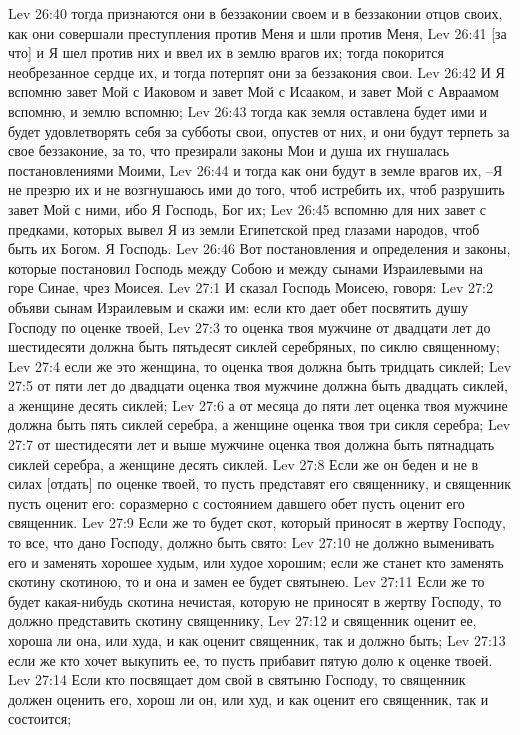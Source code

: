 Lev 26:40  тогда признаются они в беззаконии своем и в беззаконии отцов своих, как они совершали преступления против Меня и шли против Меня,
Lev 26:41  [за что] и Я шел против них и ввел их в землю врагов их; тогда покорится необрезанное сердце их, и тогда потерпят они за беззакония свои.
Lev 26:42  И Я вспомню завет Мой с Иаковом и завет Мой с Исааком, и завет Мой с Авраамом вспомню, и землю вспомню;
Lev 26:43  тогда как земля оставлена будет ими и будет удовлетворять себя за субботы свои, опустев от них, и они будут терпеть за свое беззаконие, за то, что презирали законы Мои и душа их гнушалась постановлениями Моими,
Lev 26:44  и тогда как они будут в земле врагов их, --Я не презрю их и не возгнушаюсь ими до того, чтоб истребить их, чтоб разрушить завет Мой с ними, ибо Я Господь, Бог их;
Lev 26:45  вспомню для них завет с предками, которых вывел Я из земли Египетской пред глазами народов, чтоб быть их Богом. Я Господь.
Lev 26:46  Вот постановления и определения и законы, которые постановил Господь между Собою и между сынами Израилевыми на горе Синае, чрез Моисея.
Lev 27:1  И сказал Господь Моисею, говоря:
Lev 27:2  объяви сынам Израилевым и скажи им: если кто дает обет посвятить душу Господу по оценке твоей,
Lev 27:3  то оценка твоя мужчине от двадцати лет до шестидесяти должна быть пятьдесят сиклей серебряных, по сиклю священному;
Lev 27:4  если же это женщина, то оценка твоя должна быть тридцать сиклей;
Lev 27:5  от пяти лет до двадцати оценка твоя мужчине должна быть двадцать сиклей, а женщине десять сиклей;
Lev 27:6  а от месяца до пяти лет оценка твоя мужчине должна быть пять сиклей серебра, а женщине оценка твоя три сикля серебра;
Lev 27:7  от шестидесяти лет и выше мужчине оценка твоя должна быть пятнадцать сиклей серебра, а женщине десять сиклей.
Lev 27:8  Если же он беден и не в силах [отдать] по оценке твоей, то пусть представят его священнику, и священник пусть оценит его: соразмерно с состоянием давшего обет пусть оценит его священник.
Lev 27:9  Если же то будет скот, который приносят в жертву Господу, то все, что дано Господу, должно быть свято:
Lev 27:10  не должно выменивать его и заменять хорошее худым, или худое хорошим; если же станет кто заменять скотину скотиною, то и она и замен ее будет святынею.
Lev 27:11  Если же то будет какая-нибудь скотина нечистая, которую не приносят в жертву Господу, то должно представить скотину священнику,
Lev 27:12  и священник оценит ее, хороша ли она, или худа, и как оценит священник, так и должно быть;
Lev 27:13  если же кто хочет выкупить ее, то пусть прибавит пятую долю к оценке твоей.
Lev 27:14  Если кто посвящает дом свой в святыню Господу, то священник должен оценить его, хорош ли он, или худ, и как оценит его священник, так и состоится;

